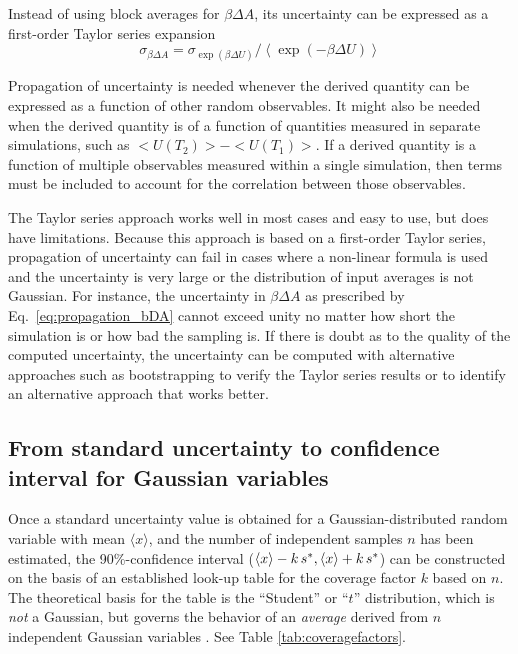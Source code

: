 Instead of using block averages for $\beta \Delta A$, its uncertainty can be expressed as a first-order Taylor series expansion
\begin{equation}
  \sigma_{\beta \Delta A} = \sigma_{\exp(\beta \Delta U)} / \left< \exp \left(-\beta \Delta U\right) \right>
  \label{eq:propagation_bDA}
\end{equation}

Propagation of uncertainty is needed whenever the derived quantity can be expressed as a function of other random observables.  It might also be needed when the derived quantity is of a function of quantities measured in separate simulations, such as $<U(T_2)>-<U(T_1)>$.  If a derived quantity is a function of multiple observables measured within a single simulation, then terms must be included to account for the correlation between those observables.

The Taylor series approach works well in most cases and easy to use, but does have limitations.  Because this approach is based on a first-order Taylor series, propagation of uncertainty can fail in cases where a non-linear formula is used and the uncertainty is very large or the distribution of input averages is not Gaussian.  For instance, the uncertainty in $\beta \Delta A$ as prescribed by Eq.~\ref{eq:propagation_bDA} cannot exceed unity no matter how short the simulation is or how bad the sampling is.  If there is doubt as to the quality of the computed uncertainty, the uncertainty can be computed with alternative approaches such as bootstrapping to verify the Taylor series results or to identify an alternative approach that works better.

\subsection{From standard uncertainty to confidence interval for Gaussian variables}
Once a standard uncertainty value is obtained for a Gaussian-distributed random variable with mean $\langle x \rangle$, and the number of independent samples $n$ has been estimated, the 90\%-confidence interval ($\langle x \rangle -k \, s^*, \langle x \rangle + k \, s^*$) can be constructed on the basis of an established look-up table for the coverage factor $k$ based on $n$.  The theoretical basis for the table is the ``Student'' or ``$t$'' distribution, which is \emph{not} a Gaussian, but governs the behavior of an \emph{average} derived from $n$ independent Gaussian variables  \cite{JCGM:GUM2008}.  See Table \ref{tab:coveragefactors}.

